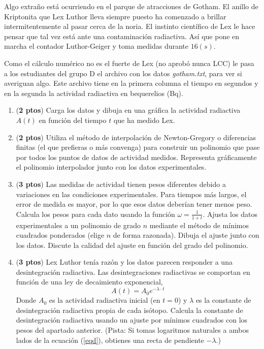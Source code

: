 Algo extraño está ocurriendo en el parque de atracciones de Gotham. El anillo de Kriptonita que Lex Luthor lleva siempre puesto ha comenzado a brillar intermitentemente al pasar cerca de la noria. El instinto científico de Lex le hace pensar que tal vez está ante una contaminación radiactiva. Así que pone en marcha el contador Luthor-Geiger y toma medidas durante $16(s)$. 

Como el cálculo numérico no es el fuerte de Lex (no aprobó nunca LCC) le pasa a los estudiantes del grupo D el archivo con los datos \textit{gotham.txt}, para ver si averiguan algo. Este archivo tiene en la primera columna el tiempo en segundos y en la segunda la actividad radiactiva en bequerelios (Bq).

\begin{enumerate}
	\item (\textbf{2 ptos}) Carga los datos y dibuja en una gráfica la actividad radiactiva $A(t)$ en función del tiempo $t$ que ha medido Lex.
	\item (\textbf{2 ptos}) Utiliza el método de interpolación de Newton-Gregory o diferencias finitas (el que prefieras o más convenga) para construir un polinomio que pase por todos los puntos de datos de actividad medidos. Representa gráficamente el polinomio interpolador junto con los datos experimentales.
	\item (\textbf{3 ptos}) Las medidas de actividad tienen pesos diferentes debido a variaciones en las condiciones experimentales. Para tiempos más largos, el error de medida es mayor, por lo que esos datos deberían tener menos peso. Calcula los pesos para cada dato usando la función $\omega=\frac{1}{1+t}$. Ajusta los datos experimentales a un polinomio de grado $n$ mediante el método de mínimos cuadrados ponderados (elige $n$ de forma razonada). Dibuja el ajuste junto con los datos. Discute la calidad del ajuste en función del grado del polinomio.
	\item (\textbf{3 ptos}) Lex Luthor tenía razón y los datos parecen responder a una desintegración radiactiva. Las desintegraciones radiactivas se comportan en función de una ley de decaimiento exponencial, 
	\begin{equation}\label{eqd}
		A(t)=A_0 e^{-\lambda\cdot t}
	\end{equation}
	Donde $A_0$ es la actividad radiactiva inicial (en $t=0$) y $\lambda$ es la constante de desintegración radiactiva propia de cada isótopo. Calcula la constante de desintegración radiactiva usando un ajuste por mínimos cuadrados con los pesos del apartado anterior.
	(Pista: Si tomas logaritmos naturales a ambos lados de la ecuación (\ref{eqd}), obtienes una recta de pendiente $-\lambda$.)
\end{enumerate}

